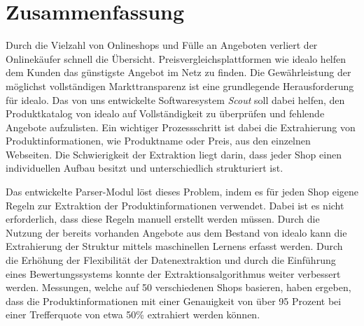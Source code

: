 \section*{Zusammenfassung}
\label{sec:abstract}

Durch die Vielzahl von Onlineshops und Fülle an Angeboten verliert der Onlinekäufer schnell die Übersicht.
Preisvergleichsplattformen wie idealo helfen dem Kunden das günstigste Angebot im Netz zu finden.
Die Gewährleistung der möglichst vollständigen Markttransparenz ist eine grundlegende Herausforderung für idealo.
Das von uns entwickelte Softwaresystem \textit{Scout} soll dabei helfen, den Produktkatalog von idealo auf
Vollständigkeit zu überprüfen und fehlende Angebote aufzulisten.
Ein wichtiger Prozessschritt ist dabei die Extrahierung von Produktinformationen, wie Produktname oder Preis, aus den
einzelnen Webseiten.
Die Schwierigkeit der Extraktion liegt darin, dass jeder Shop einen individuellen Aufbau besitzt und unterschiedlich
strukturiert ist.

Das entwickelte Parser-Modul löst dieses Problem, indem es für jeden Shop eigene Regeln zur Extraktion der
Produktinformationen verwendet.
Dabei ist es nicht erforderlich, dass diese Regeln manuell erstellt werden müssen.
Durch die Nutzung der bereits vorhanden Angebote aus dem Bestand von idealo kann die Extrahierung der Struktur
mittels maschinellen Lernens erfasst werden.
Durch die Erhöhung der Flexibilität der Datenextraktion und durch die Einführung eines Bewertungssystems konnte der
Extraktionsalgorithmus weiter verbessert werden.
Messungen, welche auf 50 verschiedenen Shops basieren, haben ergeben, dass die Produktinformationen mit einer
Genauigkeit von über 95 Prozent bei einer Trefferquote von etwa 50\% extrahiert werden können.